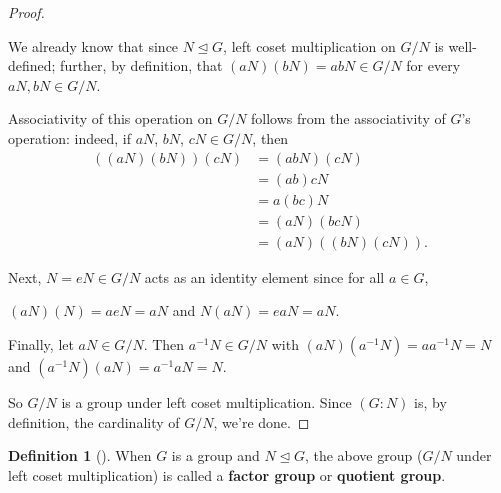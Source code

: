 \documentclass[10pt,]{book}
\newcommand{\terminology}[1]{\textbf{#1}}
\theoremstyle{plain}
\theoremstyle{definition}
\newtheorem{definition}[theorem]{Definition}
\theoremstyle{definition}
\theoremstyle{definition}
\theoremstyle{definition}
\numberwithin{equation}{section}
\newcommand{\amp}{&}
\begin{document}
\begin{proof}\hypertarget{proof-50}{}
We already know that since \(N\unlhd G\), left coset multiplication on \(G/N\) is well-defined; further, by definition, that \((aN)(bN)=abN\in G/N\) for every \(aN,bN\in G/N\).%
\par
Associativity of this operation on \(G/N\) follows from the associativity of \(G\)'s operation: indeed, if \(aN\), \(bN\), \(cN \in
G/N\), then%
\begin{align*}
((aN)(bN))(cN)\amp =(abN)(cN)\\
\amp =(ab)cN\\
\amp =a(bc)N\\
\amp =(aN)(bcN)\\
\amp =(aN)((bN)(cN)).
\end{align*}
%
\par
Next, \(N=eN\in G/N\) acts as an identity element since for all \(a\in
G\),%
\par
\((aN)(N)=aeN=aN\) and \(N(aN)=eaN=aN\).%
\par
Finally, let \(aN\in G/N\). Then \(a^{-1}N\in G/N\) with \((aN)(a^{-1}N)=aa^{-1}N=N\) and \((a^{-1}N)(aN)=a^{-1}aN=N\).%
\par
So \(G/N\) is a group under left coset multiplication. Since \((G:N)\) is, by definition, the cardinality of \(G/N\), we're done.%
\end{proof}
\begin{definition}[{}]\label{definition-70}
\label{notation-76}
When \(G\) is a group and \(N\unlhd G\), the above group (\(G/N\) under left coset multiplication) is called a \terminology{factor group} or \terminology{quotient group}.%
\end{definition}
\end{document}
